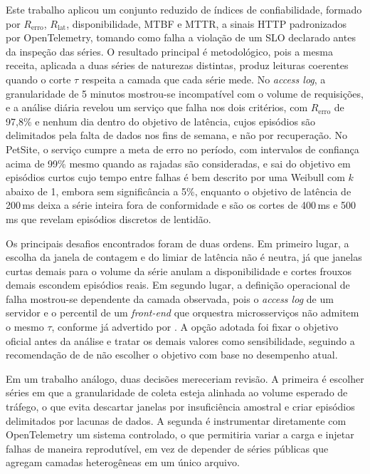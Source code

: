 \documentclass[12pt, a4paper, oneside]{article}
\begin{document}
Este trabalho aplicou um conjunto reduzido de índices de confiabilidade, formado por $R_{\mathrm{erro}}$, $R_{\mathrm{lat}}$, disponibilidade, MTBF e MTTR, a sinais HTTP padronizados por OpenTelemetry, tomando como falha a violação de um SLO declarado antes da inspeção das séries. O resultado principal é metodológico, pois a mesma receita, aplicada a duas séries de naturezas distintas, produz leituras coerentes quando o corte $\tau$ respeita a camada que cada série mede. No \textit{access log}, a granularidade de 5 minutos mostrou-se incompatível com o volume de requisições, e a análise diária revelou um serviço que falha nos dois critérios, com $R_{\mathrm{erro}}$ de 97,8\% e nenhum dia dentro do objetivo de latência, cujos episódios são delimitados pela falta de dados nos fins de semana, e não por recuperação. No PetSite, o serviço cumpre a meta de erro no período, com intervalos de confiança acima de 99\% mesmo quando as rajadas são consideradas, e sai do objetivo em episódios curtos cujo tempo entre falhas é bem descrito por uma Weibull com $k$ abaixo de 1, embora sem significância a 5\%, enquanto o objetivo de latência de 200\,ms deixa a série inteira fora de conformidade e são os cortes de 400\,ms e 500\,ms que revelam episódios discretos de lentidão.

Os principais desafios encontrados foram de duas ordens. Em primeiro lugar, a escolha da janela de contagem e do limiar de latência não é neutra, já que janelas curtas demais para o volume da série anulam a disponibilidade e cortes frouxos demais escondem episódios reais. Em segundo lugar, a definição operacional de falha mostrou-se dependente da camada observada, pois o \textit{access log} de um servidor e o percentil de um \textit{front-end} que orquestra microsserviços não admitem o mesmo $\tau$, conforme já advertido por . A opção adotada foi fixar o objetivo oficial antes da análise e tratar os demais valores como sensibilidade, seguindo a recomendação de  de não escolher o objetivo com base no desempenho atual.

Em um trabalho análogo, duas decisões mereceriam revisão. A primeira é escolher séries em que a granularidade de coleta esteja alinhada ao volume esperado de tráfego, o que evita descartar janelas por insuficiência amostral e criar episódios delimitados por lacunas de dados. A segunda é instrumentar diretamente com OpenTelemetry um sistema controlado, o que permitiria variar a carga e injetar falhas de maneira reprodutível, em vez de depender de séries públicas que agregam camadas heterogêneas em um único arquivo.
\end{document}
